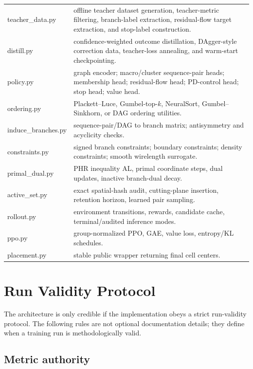 \documentclass[11pt]{article}
\begin{document}
\begin{center}
\small
\begin{tabularx}{\textwidth}{>{\ttfamily\footnotesize}p{}Y}
teacher\_data.py & offline teacher dataset generation, teacher-metric filtering, branch-label extraction, residual-flow target extraction, and stop-label construction. \\
distill.py & confidence-weighted outcome distillation, DAgger-style correction data, teacher-loss annealing, and warm-start checkpointing. \\
policy.py & graph encoder; macro/cluster sequence-pair heads; membership head; residual-flow head; PD-control head; stop head; value head. \\
ordering.py & Plackett--Luce, Gumbel-top-$k$, NeuralSort, Gumbel--Sinkhorn, or DAG ordering utilities. \\
induce\_branches.py & sequence-pair/DAG to branch matrix; antisymmetry and acyclicity checks. \\
constraints.py & signed branch constraints; boundary constraints; density constraints; smooth wirelength surrogate. \\
primal\_dual.py & PHR inequality AL, primal coordinate steps, dual updates, inactive branch-dual decay. \\
active\_set.py & exact spatial-hash audit, cutting-plane insertion, retention horizon, learned pair sampling. \\
rollout.py & environment transitions, rewards, candidate cache, terminal/audited inference modes. \\
ppo.py & group-normalized PPO, GAE, value loss, entropy/KL schedules. \\
placement.py & stable public wrapper returning final cell centers. \\
\end{tabularx}

\end{center}

\section{Run Validity Protocol}

The architecture is only credible if the implementation obeys a strict run-validity protocol. The following rules are not optional documentation details; they define when a training run is methodologically valid.

\subsection{Metric authority}
\end{document}
